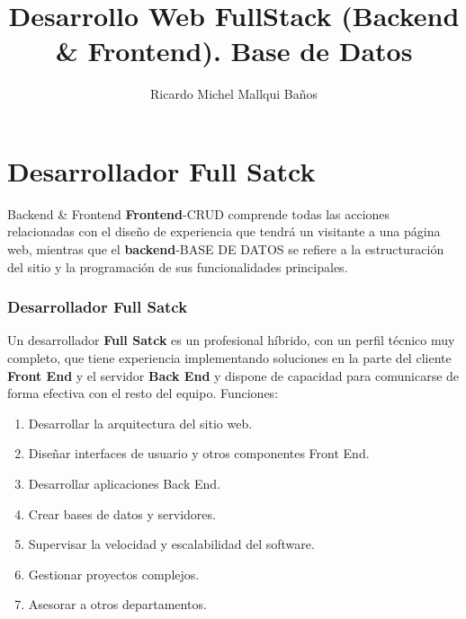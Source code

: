 \documentclass[11pt]{beamer}
\begin{document}
\title{Desarrollo Web FullStack (Backend \& Frontend). Base de Datos}
\author{Ricardo Michel Mallqui Baños}
	\begin{frame}[plain]
		\maketitle
	\end{frame}

\begin{frame}
	\tableofcontents
\end{frame}
		\section{Desarrollador Full Satck}
\begin{frame}{Backend \& Frontend}
	\textbf{Frontend}-CRUD comprende todas las acciones relacionadas con el diseño de experiencia que tendrá un visitante a una página web, mientras que el \textbf{backend}-BASE DE DATOS se refiere a la estructuración del sitio y la programación de sus funcionalidades principales.
\end{frame}

	
	\begin{frame}
		\frametitle{Desarrollador Full Satck}
Un desarrollador \textbf{Full Satck} es un profesional híbrido, con un perfil técnico muy completo, que tiene experiencia implementando soluciones en la parte del cliente \textbf{Front End} y el servidor \textbf{Back End} y dispone de capacidad para comunicarse de forma efectiva con el resto del equipo. Funciones:

\begin{enumerate}
	\item Desarrollar la arquitectura del sitio web.
	\item Diseñar interfaces de usuario y otros componentes Front End.
	\item Desarrollar aplicaciones Back End.
	\item Crear bases de datos y servidores.
	\item Supervisar la velocidad y escalabilidad del software.
	\item Gestionar proyectos complejos.
	\item Asesorar a otros departamentos.
\end{enumerate}

	\end{frame}
\end{document}
